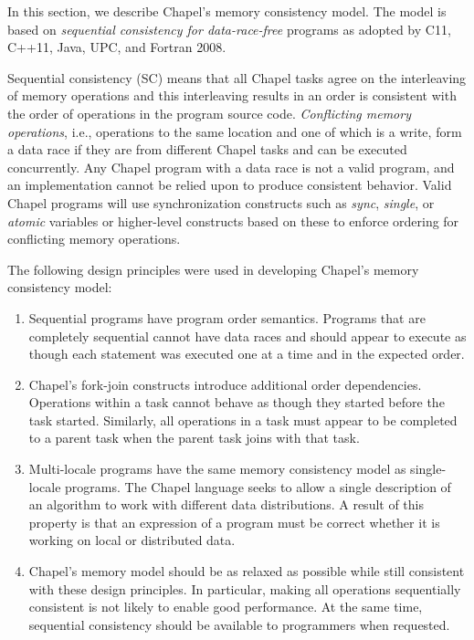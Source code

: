 \label{Memory_Consistency_Model}

In this section, we describe Chapel's memory consistency model. The
model is based on \emph{sequential consistency for data-race-free}
programs as adopted by C11, C++11, Java, UPC, and Fortran 2008.

Sequential consistency (SC) means that all Chapel tasks agree on the
interleaving of memory operations and this interleaving results in an
order is consistent with the order of operations in the program source
code.  \emph{Conflicting memory operations}, i.e., operations to the
same location and one of which is a write, form a data race if they
are from different Chapel tasks and can be executed concurrently.  Any
Chapel program with a data race is not a valid program, and an
implementation cannot be relied upon to produce consistent behavior.
Valid Chapel programs will use synchronization constructs such
as \emph{sync}, \emph{single}, or \emph{atomic} variables or
higher-level constructs based on these to enforce ordering for
conflicting memory operations.

The following design principles were used in developing Chapel's memory
consistency model:

\begin{enumerate}

  \item Sequential programs have program order semantics.  Programs that
  are completely sequential cannot have data races and should appear to
  execute as though each statement was executed one at a time and in the
  expected order.

  \item Chapel's fork-join constructs introduce additional order
  dependencies.  Operations within a task cannot behave as though they
  started before the task started. Similarly, all operations in a task
  must appear to be completed to a parent task when the parent task joins
  with that task.

  \item Multi-locale programs have the same memory consistency model as
  single-locale programs. The Chapel language seeks to allow a single
  description of an algorithm to work with different data distributions.
  A result of this property is that an expression of a program must be
  correct whether it is working on local or distributed data.

  \item Chapel's memory model should be as relaxed as possible while still
  consistent with these design principles. In particular, making all
  operations sequentially consistent is not likely to enable good
  performance. At the same time, sequential consistency should be
  available to programmers when requested.

\end{enumerate}

